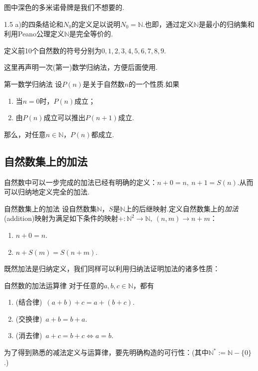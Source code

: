 图中深色的多米诺骨牌是我们不想要的.

1.5 a)的四条结论和$N_0$的定义足以说明$N_0=\mathbb{N}$.也即，通过定义$\mathbb{N}$是最小的归纳集和利用Peano公理定义$\mathbb{N}$是完全等价的.

定义前10个自然数的符号分别为$0,1,2,3,4,5,6,7,8,9$.

这里再声明一次(第一)数学归纳法，方便后面使用.

\begin{theorem}{第一数学归纳法}
	设$P(n)$是关于自然数$n$的一个性质.如果
	\begin{enumerate}
		\item 当$n=0$时，$P(n)$成立；
		\item 由$P(n)$成立可以推出$P(n+1)$成立.
	\end{enumerate}
	那么，对任意$n \in \mathbb{N}$，$P(n)$都成立.
\end{theorem}

\subsection{自然数集上的加法}

自然数中可以一步完成的加法已经有明确的定义：$n+0=n,~n+1=S(n)$.从而可以归纳地定义完全的加法.

\begin{definition}{自然数集上的加法}
	设自然数集$\mathbb{N}$，$S$是$\mathbb{N}$上的后继映射.定义自然数集上的\textit{加法}(addition)映射为满足如下条件的映射$+:\mathbb{N}^2 \to \mathbb{N},~(n,m) \to n+m$：
	\begin{enumerate}
		\item $n+0=n$.
		\item $n+S(m)=S(n+m)$.
	\end{enumerate}
\end{definition}

既然加法是归纳定义，我们同样可以利用归纳法证明加法的诸多性质：

\begin{proposition}{自然数的加法运算律}
	对于任意的$a,b,c \in \mathbb{N}$，都有
	\begin{enumerate}
		\item (结合律)~$(a+b)+c = a+(b+c)$.
		\item (交换律)~$a+b=b+a$.
		\item (消去律)~$a+c=b+c \Leftrightarrow a=b$.
	\end{enumerate}
\end{proposition}

为了得到熟悉的减法定义与运算律，要先明确构造的可行性：(其中$\mathbb{N}^* := \mathbb{N} - \{ 0 \}$.)

